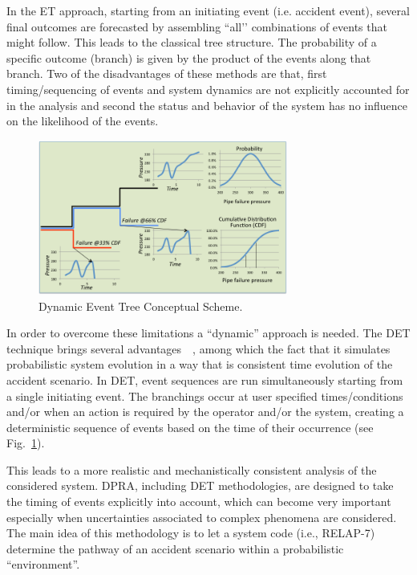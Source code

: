 \label{sec:det}
In the ET approach, starting from an initiating event (i.e. accident event), several final outcomes are forecasted by assembling ``all’’ combinations of events that might follow. This leads to the classical tree structure. The probability of a specific outcome (branch) is given by the product of the events along that branch. 
Two of the disadvantages of these methods are that, first timing/sequencing of events and system dynamics are not explicitly accounted for in the analysis and second the status and behavior of the system has no influence on the likelihood of the events.
\begin{figure}[h] 
  \centering
     \includegraphics[width=0.73\textwidth]{figures/DET_schemeFlow.png}
  \caption{Dynamic Event Tree Conceptual Scheme.}
   \label{fig:DET_schemeFlow}
\end{figure}
In order to overcome these limitations a ``dynamic'' approach is needed. The DET technique brings several advantages~\cite{alfonsiPSA}~\cite{ADAPTHakobyan}, among which the fact that it simulates probabilistic system evolution in a way that is consistent time evolution of the accident scenario. In DET,  event sequences are run simultaneously starting from a single initiating event. The branchings occur at user specified times/conditions and/or when an action is required by the operator and/or the system, creating a deterministic sequence of events based on the time of their occurrence (see Fig.~\ref{fig:DET_schemeFlow}). 

This leads to a more realistic and mechanistically consistent analysis of the considered system. DPRA, including  DET methodologies,  are designed to take the timing of events explicitly into account, which can become very important especially when uncertainties associated to complex phenomena are considered. \\
The main idea of this methodology is to let a system code (i.e., RELAP-7) determine the pathway of an accident scenario within a probabilistic ``environment''. 

